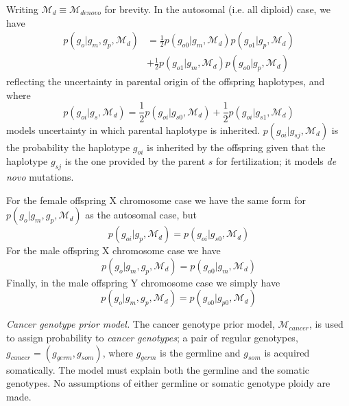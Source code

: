 \documentclass[notitlepage, twocolumn, 10pt]{article}
\begin{document}
Writing $\mathcal{M}_{d} \equiv \mathcal{M}_{denovo}$ for brevity. In the autosomal (i.e. all diploid) case, we have
\begin{align*}
    p(g_o | g_m, g_p, \mathcal{M}_{d}) &= \frac{1}{2} p(g_{o0} | g_m, \mathcal{M}_{d})p(g_{o1} | g_p, \mathcal{M}_{d}) \\ &+ \frac{1}{2} p(g_{o1} | g_m, \mathcal{M}_{d}) p(g_{o0} |g_p, \mathcal{M}_{d})
\end{align*}
reflecting the uncertainty in parental origin of the offspring haplotypes, and where
\begin{equation*}
p(g_{oi} |g_s, \mathcal{M}_{d}) = \frac{1}{2} p(g_{oi} | g_{s0}, \mathcal{M}_{d}) + \frac{1}{2} p(g_{oi} | g_{s1}, \mathcal{M}_{d})
\end{equation*}
models uncertainty in which parental haplotype is inherited. $p(g_{oi} | g_{sj}, \mathcal{M}_{d})$ is the probability the haplotype $g_{oi}$ is inherited by the offspring given that the haplotype $g_{sj}$ is the one provided by the parent $s$ for fertilization; it models \textit{de novo} mutations.

For the female offspring X chromosome case we have the same form for $p(g_o | g_m, g_p, \mathcal{M}_{d})$ as the autosomal case, but
\begin{equation*}
p(g_{oi} | g_p, \mathcal{M}_{d}) = p(g_{oi} | g_{s0}, \mathcal{M}_{d})
\end{equation*}
For the male offspring X chromosome case we have
\begin{equation*}
 p(g_o | g_m, g_p, \mathcal{M}_{d}) = p(g_{o0} | g_m, \mathcal{M}_{d})
\end{equation*}
Finally, in the male offspring Y chromosome case we simply have
\begin{equation*}
 p(g_o | g_m, g_p, \mathcal{M}_{d}) = p(g_{o0} | g_{p0}, \mathcal{M}_{d})
\end{equation*}

\vspace{3mm}
\noindent\emph{Cancer genotype prior model.} The cancer genotype prior model, $\mathcal{M}_{cancer}$, is used to assign probability to \emph{cancer genotypes}; a pair of regular genotypes, $g_{cancer} = (g_{germ}, g_{som})$, where $g_{germ}$ is the germline and $g_{som}$ is acquired somatically. The model must explain both the germline and the somatic genotypes. No assumptions of either germline or somatic genotype ploidy are made.
\end{document}
